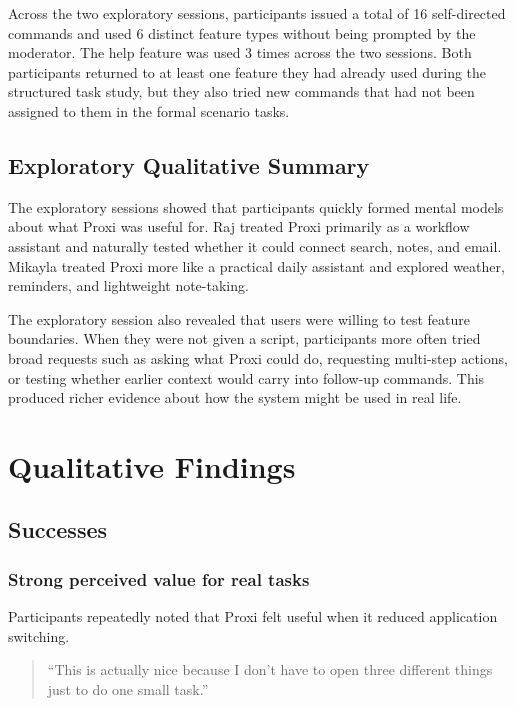 \documentclass[12pt, titlepage]{article}
\begin{document}
Across the two exploratory sessions, participants issued a total of 16
self-directed commands and used 6 distinct feature types without being
prompted by the moderator. The help feature was used 3 times across the
two sessions. Both participants returned to at least one feature they
had already used during the structured task study, but they also tried
new commands that had not been assigned to them in the formal scenario
tasks.

\subsection{Exploratory Qualitative Summary}

The exploratory sessions showed that participants quickly formed mental
models about what Proxi was useful for. Raj treated Proxi primarily as a
workflow assistant and naturally tested whether it could connect search,
notes, and email. Mikayla treated Proxi more like a practical daily
assistant and explored weather, reminders, and lightweight note-taking.

The exploratory session also revealed that users were willing to test
feature boundaries. When they were not given a script, participants
more often tried broad requests such as asking what Proxi could do,
requesting multi-step actions, or testing whether earlier context would
carry into follow-up commands. This produced richer evidence about how
the system might be used in real life.

\section{Qualitative Findings}

\subsection{Successes}

\subsubsection{Strong perceived value for real tasks}

Participants repeatedly noted that Proxi felt useful when it reduced
application switching.

\begin{quote}
``This is actually nice because I don't have to open three different
things just to do one small task.''
\end{quote}
\end{document}
